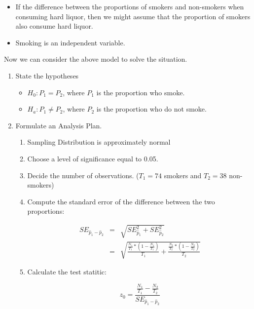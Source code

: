 \documentclass[11pt]{book}\usepackage[]{graphicx}\usepackage[]{color}
\begin{document}
\begin{itemize}
\item If the difference between the proportions of smokers and non-smokers when consuming hard liquor, then we might assume that the proportion of smokers also consume hard liquor.
\item Smoking is an independent variable.
\end{itemize}

Now we can consider the above model to solve the situation.

\begin{enumerate}
\item State the hypotheses

  \begin{itemize}
  \item $H_0: P_1 = P_2$,   where $P_1$ is the proportion who smoke.
  \item $H_a: P_1 \ne P_2$, where $P_2$ is the proportion who do not smoke.
  \end{itemize}

\item Formulate an Analysis Plan.

  \begin{enumerate}
  \item Sampling Distribution is approximately normal
  \item Choose a level of significance equal to 0.05.
  \item Decide the number of observations. ($T_1 = 74$ smokers and $T_2 = 38$ non-smokers)
  \item Compute the standard error of the difference between the two proportions:

  \begin{eqnarray*}
    SE_{\hat{p}_1-\hat{p}_2} &=& \sqrt{SE_{\hat{p}_1}^2 + SE_{\hat{p}_2}^2} \\
             &=& \sqrt{ \frac{\frac{N_1}{T_1} *(1 - \frac{N_1}{T_1})}{T_1} + \frac{\frac{N_2}{T_2} *(1 - \frac{N_2}{T_2})}{T_2} }
  \end{eqnarray*}

  \item Calculate the test statitic:

    \begin{equation*}
    z_0 = \frac{\frac{N_1}{T_1} - \frac{N_2}{T_2}}{SE_{\hat{p}_1-\hat{p}_2}}
    \end{equation*}

  \end{enumerate}



\end{enumerate}
\end{document}
